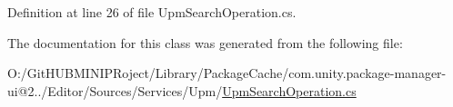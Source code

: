 Definition at line 26 of file Upm\+Search\+Operation.\+cs.



The documentation for this class was generated from the following file\+:\begin{DoxyCompactItemize}
\item 
O\+:/\+Git\+H\+U\+B\+M\+I\+N\+I\+P\+Roject/\+Library/\+Package\+Cache/com.\+unity.\+package-\/manager-\/ui@2../\+Editor/\+Sources/\+Services/\+Upm/\mbox{\hyperlink{_upm_search_operation_8cs}{Upm\+Search\+Operation.\+cs}}\end{DoxyCompactItemize}
